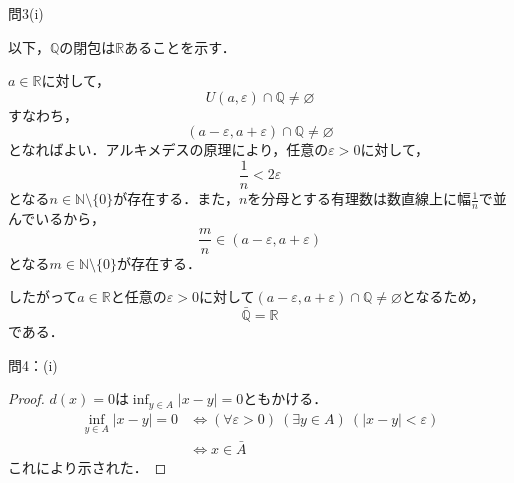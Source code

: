 \documentclass[dvipdfmx,uplatex,11pt]{jsarticle}
\theoremstyle{definition}
\begin{document}
問3(i)
\begin{leftbar}
    以下，$\mathbb{Q}$の閉包は$\mathbb{R}$あることを示す．\par 
    $a \in \mathbb{R}$に対して，
    \[
    U(a,\varepsilon) \cap \mathbb{Q} \ne \varnothing
    \]
    すなわち，
    \[
        (a-\varepsilon,a+\varepsilon) \cap \mathbb{Q} \ne \varnothing
    \]
    となればよい．アルキメデスの原理により，任意の$\varepsilon >0$に対して，
    \[
        \frac{1}{n}< 2\varepsilon 
    \]
    となる$n \in \mathbb{N} \setminus \{0\}$が存在する．また，$n$を分母とする有理数は数直線上に幅$\frac{1}{n}$で並んでいるから，
    \[
        \frac{m}{n} \in (a-\varepsilon,a+\varepsilon)
    \]
    となる$ m \in \mathbb{N} \setminus \{0\}$が存在する．\par 
    したがって$a \in \mathbb{R}$と任意の$\varepsilon>0$に対して$(a-\varepsilon,a+\varepsilon) \cap \mathbb{Q} \ne \varnothing$となるため，
    \[
        \bar{\mathbb{Q}}=\mathbb{R}
    \]
    である．
\end{leftbar}
\newpage
問4：(i)
\begin{leftbar}
    \begin{proof}
            $d(x)=0$は$\inf_{y \in A} |x-y| =0$ともかける．
            \begin{align*}
                \inf_{y \in A} |x-y| =0 & \iff (\forall \varepsilon>0) \ (\exists y \in A)\ ( |x-y|<\varepsilon ) \\
                & \iff x \in \bar{A}
            \end{align*}
            これにより示された．
        \end{proof}
    \end{leftbar}
\newpage
\end{document}
